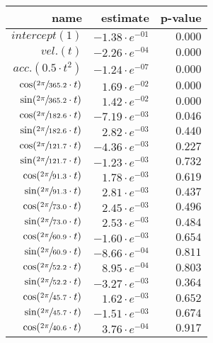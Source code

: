 \begin{tabular}{r|rr}
\hline
 name                                & estimate              & p-value   \\
\hline
 $intercept (1)$                     & $-1.38 \cdot e^{-01}$ & $0.000$   \\
 $vel. (t)$                          & $-2.26 \cdot e^{-04}$ & $0.000$   \\
 $acc. (0.5 \cdot t^2)$              & $-1.24 \cdot e^{-07}$ & $0.000$   \\
 $\cos(\sfrac{2\pi}{365.2} \cdot t)$ & $1.69 \cdot e^{-02}$  & $0.000$   \\
 $\sin(\sfrac{2\pi}{365.2} \cdot t)$ & $1.42 \cdot e^{-02}$  & $0.000$   \\
 $\cos(\sfrac{2\pi}{182.6} \cdot t)$ & $-7.19 \cdot e^{-03}$ & $0.046$   \\
 $\sin(\sfrac{2\pi}{182.6} \cdot t)$ & $2.82 \cdot e^{-03}$  & $0.440$   \\
 $\cos(\sfrac{2\pi}{121.7} \cdot t)$ & $-4.36 \cdot e^{-03}$ & $0.227$   \\
 $\sin(\sfrac{2\pi}{121.7} \cdot t)$ & $-1.23 \cdot e^{-03}$ & $0.732$   \\
 $\cos(\sfrac{2\pi}{91.3} \cdot t)$  & $1.78 \cdot e^{-03}$  & $0.619$   \\
 $\sin(\sfrac{2\pi}{91.3} \cdot t)$  & $2.81 \cdot e^{-03}$  & $0.437$   \\
 $\cos(\sfrac{2\pi}{73.0} \cdot t)$  & $2.45 \cdot e^{-03}$  & $0.496$   \\
 $\sin(\sfrac{2\pi}{73.0} \cdot t)$  & $2.53 \cdot e^{-03}$  & $0.484$   \\
 $\cos(\sfrac{2\pi}{60.9} \cdot t)$  & $-1.60 \cdot e^{-03}$ & $0.654$   \\
 $\sin(\sfrac{2\pi}{60.9} \cdot t)$  & $-8.66 \cdot e^{-04}$ & $0.811$   \\
 $\cos(\sfrac{2\pi}{52.2} \cdot t)$  & $8.95 \cdot e^{-04}$  & $0.803$   \\
 $\sin(\sfrac{2\pi}{52.2} \cdot t)$  & $-3.27 \cdot e^{-03}$ & $0.364$   \\
 $\cos(\sfrac{2\pi}{45.7} \cdot t)$  & $1.62 \cdot e^{-03}$  & $0.652$   \\
 $\sin(\sfrac{2\pi}{45.7} \cdot t)$  & $-1.51 \cdot e^{-03}$ & $0.674$   \\
 $\cos(\sfrac{2\pi}{40.6} \cdot t)$  & $3.76 \cdot e^{-04}$  & $0.917$   \\
\hline
\end{tabular}\hspace{1cm}\begin{tabular}{r|rr}

\end{tabular}

